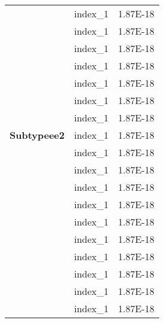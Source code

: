 \begin{longtable}{@{\extracolsep{\fill}}lll@{}}
                                          & index\_1                            & 1.87E-18            \\
                                          & index\_1                            & 1.87E-18            \\
                                          & index\_1                            & 1.87E-18            \\
                                          \hline
                                          & index\_1                            & 1.87E-18            \\
                                          & index\_1                            & 1.87E-18            \\
                                          & index\_1                            & 1.87E-18            \\
                                          & index\_1                            & 1.87E-18            \\
\textbf{Subtypeee2}                       & index\_1                            & 1.87E-18            \\
                                          & index\_1                            & 1.87E-18            \\
                                          & index\_1                            & 1.87E-18            \\
                                          & index\_1                            & 1.87E-18            \\
                                          & index\_1                            & 1.87E-18            \\
                                          & index\_1                            & 1.87E-18            \\
                                          \hline
                                          & index\_1                            & 1.87E-18            \\
                                          & index\_1                            & 1.87E-18            \\
                                          & index\_1                            & 1.87E-18            \\
                                          & index\_1                            & 1.87E-18            \\
                                          & index\_1                            & 1.87E-18            \\

\end{longtable}
